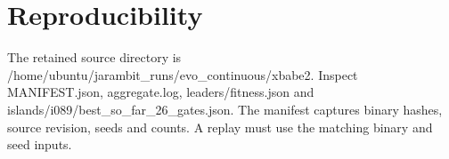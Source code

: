 \section{Reproducibility}The retained source directory is /home/ubuntu/jarambit\_runs/evo\_continuous/xbabe2. Inspect MANIFEST.json, aggregate.log, leaders/fitness.json and islands/i089/best\_so\_far\_26\_gates.json. The manifest captures binary hashes, source revision, seeds and counts. A replay must use the matching binary and seed inputs.
